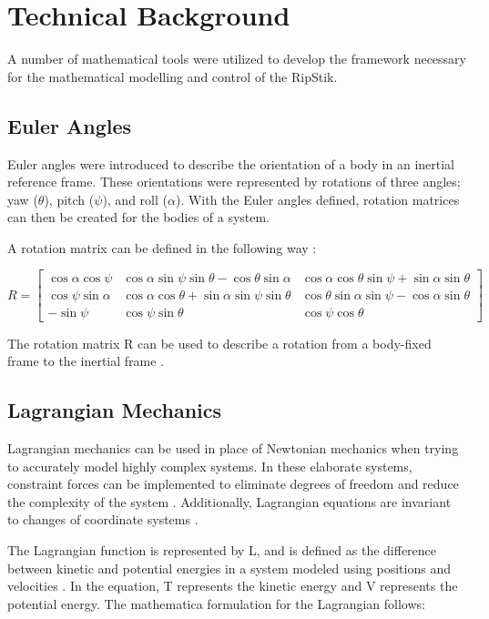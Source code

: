 \documentclass[12pt,letterpaper]{article}
\begin{document}
	
\section{Technical Background}
A number of mathematical tools were utilized to develop the framework necessary for the mathematical modelling and control of the RipStik.

\subsection{Euler Angles}

Euler angles were introduced to describe the orientation of a body in an inertial reference frame.
These orientations were represented by rotations of three angles; yaw ($\theta$), pitch ($\psi$), and roll ($\alpha$).
With the Euler angles defined, rotation matrices can then be created for the bodies of a system.

A rotation matrix can be defined in the following way \cite{Lewis}:

\begin{equation}
\label{eq:RotM}
 R =
\begin{bmatrix} 
\cos\alpha\cos\psi & \cos\alpha\sin\psi\sin\theta - \cos\theta\sin\alpha &\cos\alpha\cos\theta\sin\psi+\sin\alpha\sin\theta\\
\cos\psi\sin\alpha & \cos\alpha\cos\theta+\sin\alpha\sin\psi\sin\theta & \cos\theta\sin\alpha\sin\psi - \cos\alpha\sin\theta\\
-\sin\psi & \cos\psi\sin\theta & \cos\psi\cos\theta 
\end{bmatrix}
\end{equation}

The rotation matrix R can be used to describe a rotation from a body-fixed frame to the inertial frame \cite{VTOL}.

\subsection{Lagrangian Mechanics}

Lagrangian mechanics can be used in place of Newtonian mechanics when trying to accurately model highly complex systems.
In these elaborate systems, constraint forces can be implemented to eliminate degrees of freedom and reduce the complexity of the system \cite{LagrangeEquations}. Additionally, Lagrangian equations are invariant to changes of coordinate systems \cite{LagrangePowerpoint}.
\par
The Lagrangian function is represented by L, and is defined as the difference between kinetic and potential energies in a system modeled using positions and velocities \cite{NonholonomicPowerpoint}.
In the equation, T represents the kinetic energy and V represents the potential energy.
The mathematica formulation for the Lagrangian follows:
\end{document}

